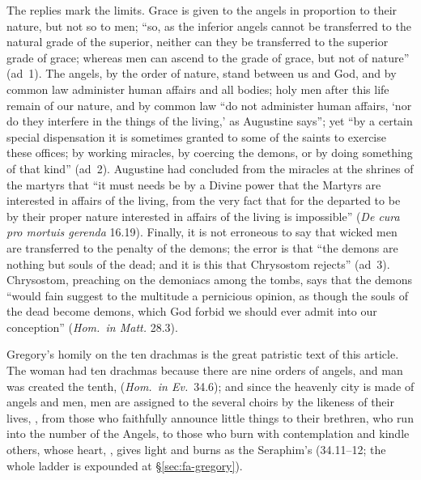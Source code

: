 The replies mark the limits. Grace is given to the angels in proportion to
their nature, but not so to men; ``so, as the inferior angels cannot be
transferred to the natural grade of the superior, neither can they be
transferred to the superior grade of grace; whereas men can ascend to the
grade of grace, but not of nature'' (ad~1). The angels, by the order of
nature, stand between us and God, and by common law administer human affairs
and all bodies; holy men after this life remain of our nature, and by common
law ``do not administer human affairs, `nor do they interfere in the things
of the living,' as Augustine says''; yet ``by a certain special dispensation
it is sometimes granted to some of the saints to exercise these offices; by
working miracles, by coercing the demons, or by doing something of that
kind'' (ad~2). Augustine had concluded from the miracles at the shrines of
the martyrs that ``it must needs be by a Divine power that the Martyrs are
interested in affairs of the living, from the very fact that for the departed
to be by their proper nature interested in affairs of the living is
impossible'' (\emph{De cura pro mortuis gerenda} 16.19). Finally, it is not
erroneous to say that wicked men are transferred to the penalty of the demons;
the error is that ``the demons are nothing but souls of the dead; and it is
this that Chrysostom rejects'' (ad~3). Chrysostom, preaching on the demoniacs
among the tombs, says that the demons ``would fain suggest to the multitude a
pernicious opinion, as though the souls of the dead become demons, which God
forbid we should ever admit into our conception'' (\emph{Hom.\ in Matt.}
28.3).

Gregory's homily on the ten drachmas is the great patristic text of this
article. The woman had ten drachmas because there are nine orders of angels,
and man was created the tenth, 
(\emph{Hom.\ in Ev.}\ 34.6); and since the heavenly city is made of angels
and men, men are assigned to the several choirs by the likeness of their
lives, ,
from those who faithfully announce little things to their brethren, who run
into the number of the Angels, to those who burn with contemplation and
kindle others, whose heart, , gives light and burns
as the Seraphim's (34.11--12; the whole ladder is expounded at
\S\ref{sec:fa-gregory}).

